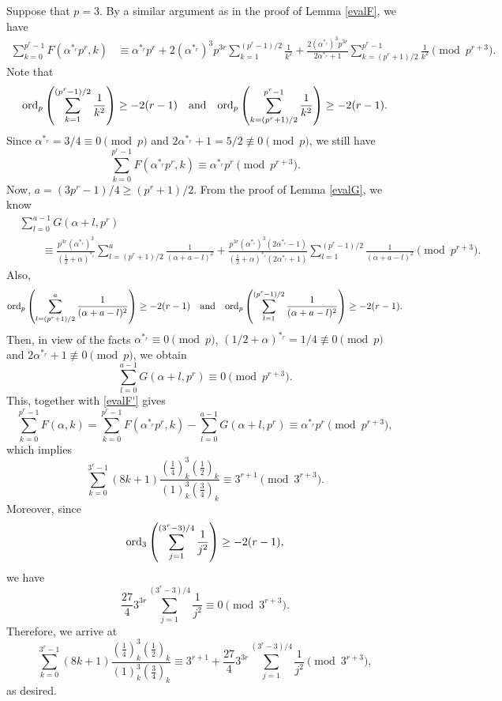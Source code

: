 \documentclass[12pt,reqno]{amsart}
\def\l{\left}
\def\r{\right}
\def\t{\text}
\def\f{\frac}
\def\ord{{\rm ord}}
\def\eq{\equiv}
\theoremstyle{plain}
\theoremstyle{definition}
\theoremstyle{remark}
\numberwithin{equation}{section}
\begin{document}
Suppose that $p=3$. By a similar argument as in the proof of Lemma \ref{evalF}, we have
\begin{align*}
\sum_{k=0}^{p^r-1}F(\alpha^{\ast_r}p^r,k)&\eq \alpha^{\ast_r}p^r+2(\alpha^{\ast_r})^3p^{3r}\sum_{k=1}^{(p^r-1)/2}\f{1}{k^2}+\f{2(\alpha^{\ast_r})^3p^{3r}}{2\alpha^{\ast_r}+1}\sum_{k=(p^r+1)/2}^{p^r-1}\f{1}{k^2}\pmod{p^{r+3}}.
\end{align*}
Note that 
$$
\ord_p\l(\sum_{k=1}^{(p^r-1)/2}\f{1}{k^2}\r)\geq -2(r-1)\quad\t{and}\quad \ord_p\l(\sum_{k=(p^r+1)/2}^{p^r-1}\f{1}{k^2}\r)\geq -2(r-1).
$$
Since $\alpha^{\ast_r}=3/4\eq0\pmod{p}$ and $2\alpha^{\ast_r}+1=5/2\not\eq0\pmod{p}$, we still have
\begin{equation}\label{evalF'}
\sum_{k=0}^{p^r-1}F(\alpha^{\ast_r}p^r,k)\eq \alpha^{\ast_r}p^r\pmod{p^{r+3}}.
\end{equation}
Now, $a=(3p^r-1)/4\geq (p^r+1)/2$. From the proof of Lemma \ref{evalG}, we know
\begin{align*}
&\sum_{l=0}^{a-1}G(\alpha+l,p^r)\\
&\qquad\eq \f{p^{3r}(\alpha^{\ast_r})^3}{(\f12+\alpha)^{\ast_r}}\sum_{l=(p^r+1)/2}^{a}\f{1}{(\alpha+a-l)^2}+\f{p^{3r}(\alpha^{\ast_r})^3(2\alpha^{\ast_r}-1)}{(\f12+\alpha)^{\ast_r}(2\alpha^{\ast_r}+1)}\sum_{l=1}^{(p^r-1)/2}\f{1}{(\alpha+a-l)^2}\pmod{p^{r+3}}.
\end{align*}
Also, 
$$
\ord_p\l(\sum_{l=(p^r+1)/2}^{a}\f{1}{(\alpha+a-l)^2}\r)\geq -2(r-1)\quad\t{and}\quad \ord_p\l(\sum_{l=1}^{(p^r-1)/2}\f{1}{(\alpha+a-l)^2}\r)\geq -2(r-1).
$$
Then, in view of the facts $\alpha^{\ast_r}\eq0\pmod{p}$, $(1/2+\alpha)^{\ast_r}=1/4\not\eq0\pmod{p}$ and $2\alpha^{\ast_r}+1\not\eq0\pmod{p}$, we obtain
$$
\sum_{l=0}^{a-1}G(\alpha+l,p^r)\eq0\pmod{p^{r+3}}.
$$
This, together with \eqref{evalF'} gives
$$
\sum_{k=0}^{p^r-1}F(\alpha,k)=\sum_{k=0}^{p^r-1}F(\alpha^{\ast_r}p^r,k)-\sum_{l=0}^{a-1}G(\alpha+l,p^r)\eq\alpha^{\ast_r}p^r\pmod{p^{r+3}},
$$
which implies
\begin{equation*}
\sum_{k=0}^{3^r-1}(8k+1)\f{(\f14)_k^3(\f12)_k}{(1)_k^3(\f34)_k}\eq 3^{r+1}\pmod{3^{r+3}}.
\end{equation*}
Moreover, since 
$$
\ord_3\l(\sum_{j=1}^{(3^r-3)/4}\f{1}{j^2}\r)\geq-2(r-1),
$$
we have
$$
\f{27}{4}3^{3r}\sum_{j=1}^{(3^r-3)/4}\f{1}{j^2}\eq 0\pmod{3^{r+3}}.
$$
Therefore, we arrive at
\begin{equation*}
\sum_{k=0}^{3^r-1}(8k+1)\f{(\f14)_k^3(\f12)_k}{(1)_k^3(\f34)_k}\eq 3^{r+1}+\f{27}{4}3^{3r}\sum_{j=1}^{(3^r-3)/4}\f{1}{j^2}\pmod{3^{r+3}},
\end{equation*}
as desired.
\end{document}
